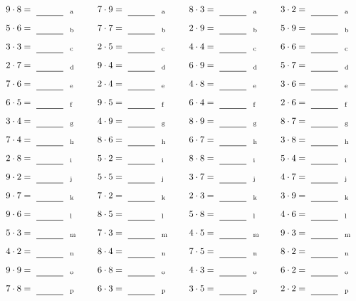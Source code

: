 \documentclass
[
  draft    = true,
  fontsize = 11pt,
  parskip  = half-
]
{scrartcl}
\begin{document}
\par\vfill\par
\begin{align*}
    \pline{9\cdot8}&=\rline{a}
  & \pline{7\cdot9}&=\rline{a}
  & \pline{8\cdot3}&=\rline{a}
  & \pline{3\cdot2}&=\rline{a} \\[1ex]
    \pline{5\cdot6}&=\rline{b}
  & \pline{7\cdot7}&=\rline{b}
  & \pline{2\cdot9}&=\rline{b}
  & \pline{5\cdot9}&=\rline{b} \\[1ex]
    \pline{3\cdot3}&=\rline{c}
  & \pline{2\cdot5}&=\rline{c}
  & \pline{4\cdot4}&=\rline{c}
  & \pline{6\cdot6}&=\rline{c} \\[1ex]
    \pline{2\cdot7}&=\rline{d}
  & \pline{9\cdot4}&=\rline{d}
  & \pline{6\cdot9}&=\rline{d}
  & \pline{5\cdot7}&=\rline{d} \\[1ex]
    \pline{7\cdot6}&=\rline{e}
  & \pline{2\cdot4}&=\rline{e}
  & \pline{4\cdot8}&=\rline{e}
  & \pline{3\cdot6}&=\rline{e} \\[1ex]
    \pline{6\cdot5}&=\rline{f}
  & \pline{9\cdot5}&=\rline{f}
  & \pline{6\cdot4}&=\rline{f}
  & \pline{2\cdot6}&=\rline{f} \\[1ex]
    \pline{3\cdot4}&=\rline{g}
  & \pline{4\cdot9}&=\rline{g}
  & \pline{8\cdot9}&=\rline{g}
  & \pline{8\cdot7}&=\rline{g} \\[1ex]
    \pline{7\cdot4}&=\rline{h}
  & \pline{8\cdot6}&=\rline{h}
  & \pline{6\cdot7}&=\rline{h}
  & \pline{3\cdot8}&=\rline{h} \\[1ex]
    \pline{2\cdot8}&=\rline{i}
  & \pline{5\cdot2}&=\rline{i}
  & \pline{8\cdot8}&=\rline{i}
  & \pline{5\cdot4}&=\rline{i} \\[1ex]
    \pline{9\cdot2}&=\rline{j}
  & \pline{5\cdot5}&=\rline{j}
  & \pline{3\cdot7}&=\rline{j}
  & \pline{4\cdot7}&=\rline{j} \\[1ex]
    \pline{9\cdot7}&=\rline{k}
  & \pline{7\cdot2}&=\rline{k}
  & \pline{2\cdot3}&=\rline{k}
  & \pline{3\cdot9}&=\rline{k} \\[1ex]
    \pline{9\cdot6}&=\rline{l}
  & \pline{8\cdot5}&=\rline{l}
  & \pline{5\cdot8}&=\rline{l}
  & \pline{4\cdot6}&=\rline{l} \\[1ex]
    \pline{5\cdot3}&=\rline{m}
  & \pline{7\cdot3}&=\rline{m}
  & \pline{4\cdot5}&=\rline{m}
  & \pline{9\cdot3}&=\rline{m} \\[1ex]
    \pline{4\cdot2}&=\rline{n}
  & \pline{8\cdot4}&=\rline{n}
  & \pline{7\cdot5}&=\rline{n}
  & \pline{8\cdot2}&=\rline{n} \\[1ex]
    \pline{9\cdot9}&=\rline{o}
  & \pline{6\cdot8}&=\rline{o}
  & \pline{4\cdot3}&=\rline{o}
  & \pline{6\cdot2}&=\rline{o} \\[1ex]
    \pline{7\cdot8}&=\rline{p}
  & \pline{6\cdot3}&=\rline{p}
  & \pline{3\cdot5}&=\rline{p}
  & \pline{2\cdot2}&=\rline{p}
\end{align*}
\end{document}
